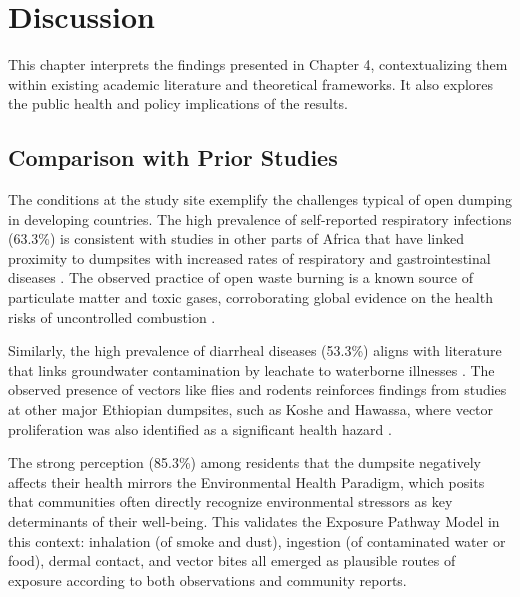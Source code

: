 
\chapter{Discussion}
\label{chap:discussion}

This chapter interprets the findings presented in Chapter 4, contextualizing them within existing academic literature and theoretical frameworks. It also explores the public health and policy implications of the results.

\section{Comparison with Prior Studies}
The conditions at the study site exemplify the challenges typical of open dumping in developing countries. The high prevalence of self-reported respiratory infections (63.3\%) is consistent with studies in other parts of Africa that have linked proximity to dumpsites with increased rates of respiratory and gastrointestinal diseases \cite{Ndejjo2016}. The observed practice of open waste burning is a known source of particulate matter and toxic gases, corroborating global evidence on the health risks of uncontrolled combustion \cite{Porta2009}.

Similarly, the high prevalence of diarrheal diseases (53.3\%) aligns with literature that links groundwater contamination by leachate to waterborne illnesses \cite{Ferronato2019}. The observed presence of vectors like flies and rodents reinforces findings from studies at other major Ethiopian dumpsites, such as Koshe and Hawassa, where vector proliferation was also identified as a significant health hazard \cite{Bogale2019, Abebe2018}.

The strong perception (85.3\%) among residents that the dumpsite negatively affects their health mirrors the Environmental Health Paradigm, which posits that communities often directly recognize environmental stressors as key determinants of their well-being. This validates the Exposure Pathway Model in this context: inhalation (of smoke and dust), ingestion (of contaminated water or food), dermal contact, and vector bites all emerged as plausible routes of exposure according to both observations and community reports.

